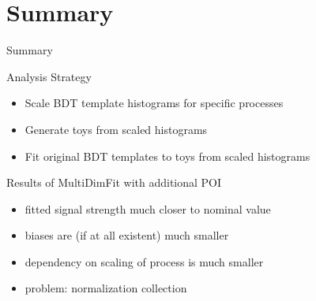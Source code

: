 \section{Summary}
\begin{frame}{Summary}

\begin{block}{Analysis Strategy}
\begin{itemize}
\item Scale BDT template histograms for specific processes
\item Generate toys from scaled histograms
\item Fit original BDT templates to toys from scaled histograms
\end{itemize}
\end{block}

\begin{block}{Results of MultiDimFit with additional POI}
\begin{itemize}
\item fitted signal strength much closer to nominal value
\item biases are (if at all existent) much smaller
\item dependency on scaling of process is much smaller
\item problem: normalization collection

\end{itemize}
\end{block}

\end{frame}

